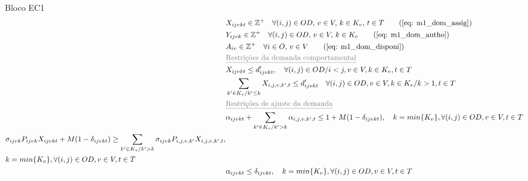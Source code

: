 \begin{bloque1}{Bloco \hypertarget{frase:EC1}{EC1} }
\begin{align}
	 & X_{ijvkt} \in \mathbb{Z}^+ \quad \forall(i,j) \in OD,\, v \in V,\, k \in K_v,\, t \in T  \tag{\ref{eq: m1_dom_assig}}                                                                                                      \\
	 & Y_{ijvk} \in \mathbb{Z}^+ \quad \forall(i,j) \in OD,\, v \in V,\, k \in K_v  \tag{\ref{eq: m1_dom_autho}}                                                                                                                  \\
	 & A_{iv} \in \mathbb{Z}^+ \quad \forall i \in O,\, v \in V  \tag{\ref{eq: m1_dom_disponi}}    \\                                                                                                                              
	 & \textcolor{gray}{\underline{\text{Restrições da demanda comportamental}} }      \notag                                                                                                                                                      \\
	 & X_{ijvkt} \leq d'_{ijvkt},  \quad \forall (i,j) \in OD / i < j  ,v \in V, k \in K_v, t\in T   \label{eq: rel_x_dem_beha}                                                                                               \\
	 & \sum_{k' \in K_v / k' \leq k}X_{i,j,v,k',t} \leq d'_{ijvkt} \quad \forall (i,j) \in OD, v \in V, k \in K_v / k > 1, t\in T     \label{eq: dem_compor_acumulacao_class}                                                \\
	 & \textcolor{gray}{\underline{\text{Restrições de ajuste da demanda}}}    \notag                                                                                                                                                           \\
	 & \alpha_{ijvkt} +  \sum_{k' \in K_v / k'>k}  \alpha_{i,j,v,k',t}  \leq 1+M(1-\delta_{ijvkt}), \quad   k = min\{K_v\}, \forall(i,j) \in OD, v \in V, t \in T  \label{eq: ajuste1}                                      \\
	\begin{split}
		 & \sigma_{ijvk}P_{ijvk}X_{ijvkt} + M(1-\delta_{ijvkt})   \geq \sum_{k' \in K_v / k'>k} \sigma_{ijvk} P_{i,j,v,k'}X_{i,j,v,k',t}, \\
		 & k = min\{K_v\}, \forall(i,j) \in OD, v \in V, t \in T
	\end{split} \label{eq: ajuste2}                                                                                             \\
	 & \alpha_{ijvkt} \leq \delta_{ijvkt}, \quad   k = min\{K_v\}, \forall(i,j) \in OD, v \in V, t \in T   \label{eq: ajuste3}                                                                                              
\end{align}
\end{bloque1}

